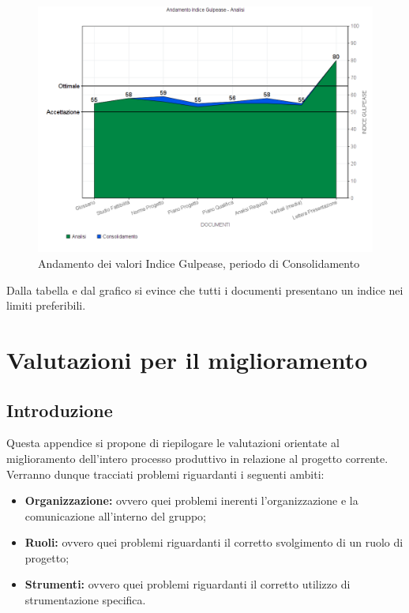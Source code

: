 \documentclass[openany,12pt,a4paper]{report}
\begin{document}
\begin{itemize}
	\begin{figure}[H]
		\includegraphics[scale=0.5]{verifica-consolidamento-gulpease}
		\centering
		\caption{Andamento dei valori Indice Gulpease, periodo di Consolidamento}
	\end{figure}
	
	Dalla tabella e dal grafico si evince che tutti i documenti presentano un indice nei limiti preferibili.	
\end{itemize}


\chapter{Valutazioni per il miglioramento}

\section{Introduzione}

Questa appendice si propone di riepilogare le valutazioni orientate al miglioramento dell'intero processo produttivo in relazione al progetto corrente. Verranno dunque tracciati problemi riguardanti i seguenti ambiti:

\begin{itemize}
	\item \textbf{Organizzazione:} ovvero quei problemi inerenti l'organizzazione e la comunicazione all'interno del gruppo;
	\item \textbf{Ruoli:} ovvero quei problemi riguardanti il corretto svolgimento di un ruolo di progetto;
	\item \textbf{Strumenti:} ovvero quei problemi riguardanti il corretto utilizzo di strumentazione specifica.
\end{itemize}
\end{document}
